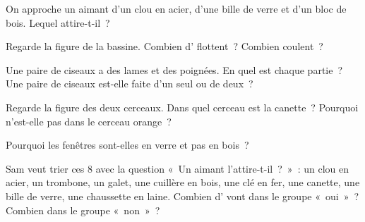 \begin{exercise}[$\star$]\label{exo:g1:materials-around-us:6}
On approche un aimant d'un clou en acier, d'une bille de verre et d'un
bloc de bois. Lequel attire-t-il~?
\end{exercise}

\begin{exercise}[$\star$]\label{exo:g1:materials-around-us:7}
Regarde la figure de la bassine. Combien d' flottent~? Combien
coulent~?
\end{exercise}

\begin{exercise}[$\star$]\label{exo:g1:materials-around-us:8}
Une paire de ciseaux a des lames et des poignées. En quel  est
chaque partie~? Une paire de ciseaux est-elle faite d'un seul 
ou de deux~?
\end{exercise}

\begin{exercise}[$\star$]\label{exo:g1:materials-around-us:9}
Regarde la figure des deux cerceaux. Dans quel cerceau est la canette~?
Pourquoi n'est-elle pas dans le cerceau orange~?
\end{exercise}

\begin{exercise}[$\star\star$]\label{exo:g1:materials-around-us:10}
Pourquoi les fenêtres sont-elles en verre et pas en bois~?
\end{exercise}

\begin{exercise}[$\star\star$]\label{exo:g1:materials-around-us:11}
Sam veut trier ces 8  avec la question «~Un aimant l'attire-t-il~?~»~:
un clou en acier, un trombone, un galet, une cuillère en bois, une clé en
fer, une canette, une bille de verre, une chaussette en laine. Combien
d' vont dans le groupe «~oui~»~? Combien dans le groupe «~non~»~?
\end{exercise}
